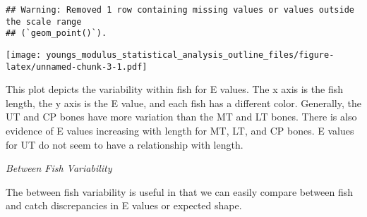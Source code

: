 \documentclass[
]{article}
\begin{document}
\begin{verbatim}
## Warning: Removed 1 row containing missing values or values outside the scale range
## (`geom_point()`).
\end{verbatim}

\texttt{[image: youngs\_modulus\_statistical\_analysis\_outline\_files/figure-latex/unnamed-chunk-3-1.pdf]}

This plot depicts the variability within fish for E values. The x axis
is the fish length, the y axis is the E value, and each fish has a
different color. Generally, the UT and CP bones have more variation than
the MT and LT bones. There is also evidence of E values increasing with
length for MT, LT, and CP bones. E values for UT do not seem to have a
relationship with length.

\emph{Between Fish Variability}

The between fish variability is useful in that we can easily compare
between fish and catch discrepancies in E values or expected shape.
\end{document}
